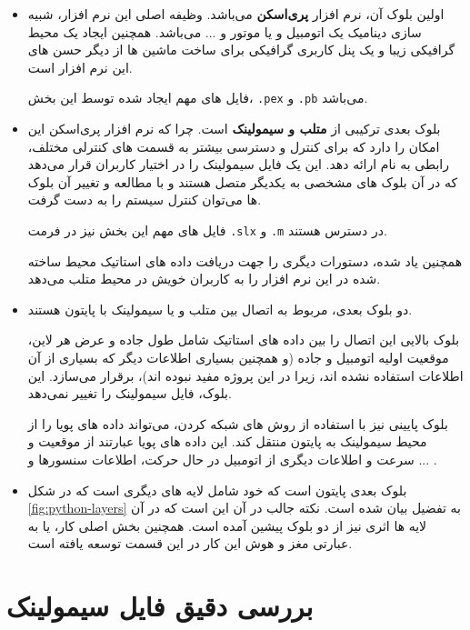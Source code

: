 \begin{itemize}
	\item 
	اولین بلوک آن، نرم افزار \textbf{پری‌اسکن }می‌باشد. وظیفه اصلی این نرم افزار، شبیه سازی دینامیک یک اتومبیل و یا موتور و ... می‌باشد. همچنین ایجاد یک محیط گرافیکی زیبا و یک پنل کاربری گرافیکی برای ساخت ماشین ها از دیگر حسن های این نرم افزار است.
	
	فایل های مهم ایجاد شده توسط این بخش، \texttt{.pex} و \texttt{.pb} می‌باشد.
	
	\item
	بلوک بعدی ترکیبی از \textbf{متلب و سیمولینک }است. چرا که نرم افزار پری‌اسکن این امکان را دارد که برای کنترل و دسترسی بیشتر به قسمت های کنترلی مختلف، رابطی به نام  ارائه دهد. این  یک فایل سیمولینک را در اختیار کاربران قرار می‌دهد که در آن بلوک های مشخصی به یکدیگر متصل هستند و با مطالعه و تغییر آن بلوک ها می‌توان کنترل سیستم را به دست گرفت.
	
	فایل های مهم این بخش نیز در فرمت \texttt{.slx} و \texttt{.m} در دسترس هستند.
	
	همچنین \api یاد شده، دستورات دیگری را جهت دریافت داده های استاتیک محیط ساخته شده در این نرم افزار را به کاربران خویش در محیط متلب می‌دهد.
	
	\item
	دو بلوک بعدی، مربوط به اتصال بین متلب و یا سیمولینک با پایتون هستند. 
	
	بلوک بالایی این اتصال را بین داده های استاتیک شامل طول جاده و عرض هر لاین، موقعیت اولیه اتومبیل و جاده (و همچنین بسیاری اطلاعات دیگر که بسیاری از آن اطلاعات استفاده نشده اند، زیرا در این پروژه مفید نبوده اند)، برقرار می‌سازد. این بلوک، فایل سیمولینک را تغییر نمی‌دهد.
	
	بلوک پایینی نیز با استفاده از روش های شبکه کردن، می‌تواند داده های پویا را از محیط سیمولینک به پایتون منتقل کند. این داده های پویا عبارتند از موقعیت و سرعت و اطلاعات دیگری از اتومبیل در حال حرکت، اطلاعات سنسورها و ... .
	
	\item 
	بلوک بعدی پایتون است که خود شامل لایه های دیگری است که در شکل 
	\ref{fig:python-layers}
	به تفضیل بیان شده است. نکته جالب در آن این است که در آن لایه ها اثری نیز از دو بلوک پیشین آمده است. همچنین بخش اصلی کار، یا به عبارتی مغز و هوش این کار در این قسمت توسعه یافته است.
\end{itemize}

\section{بررسی دقیق فایل سیمولینک}\label{ch:fani|sec:simulink}

